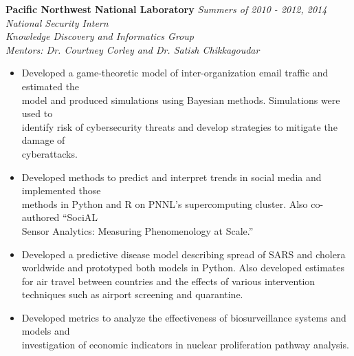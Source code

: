 \documentclass[11pt]{article}
\newenvironment{changemargin}[2]{%
  \begin{list}{}{%
    \setlength{\topsep}{0pt}%
    \setlength{\leftmargin}{#1}%
    \setlength{\rightmargin}{#2}%
    \setlength{\listparindent}{\parindent}%
    \setlength{\itemindent}{\parindent}%
    \setlength{\parsep}{\parskip}%
  }%
  \item[]}{\end{list}
}
\newenvironment{body} {
	\vspace*{-16pt}
	\begin{changemargin}{-0.25in}{-0.5in}
  }	
	{\end{changemargin}
}
\begin{document}
\begin{body}
	\textbf{Pacific Northwest National Laboratory}  \hfill \emph{Summers of 2010 - 2012, 2014}\\
	\emph{National Security Intern}\\ 
	\emph{Knowledge Discovery and Informatics Group}\\
	\emph{Mentors: Dr. Courtney Corley and Dr. Satish Chikkagoudar}
	\vspace*{-4pt}
	\begin{itemize} \itemsep -0pt  %
\item Developed a game-theoretic model of inter-organization email traffic and estimated the\\ model and produced simulations using Bayesian methods. Simulations were used to\\ identify risk of cybersecurity threats and develop strategies to mitigate the damage of\\ cyberattacks.
\item Developed methods to predict and interpret trends in social media and implemented those\\ methods in Python and R on PNNL's supercomputing cluster. Also co-authored ``SociAL\\ Sensor Analytics: Measuring Phenomenology at Scale.''
\item Developed a predictive disease model describing spread of SARS and cholera worldwide and prototyped both models in Python. Also developed estimates for air travel between countries and the effects of various intervention techniques such as airport screening and quarantine.
\item Developed metrics to analyze the effectiveness of biosurveillance systems and models and\\ investigation of economic indicators in nuclear proliferation pathway analysis.
	\end{itemize}

				
\end{body}
\vspace{-9pt}
\smallskip

\pagebreak
\end{document}
